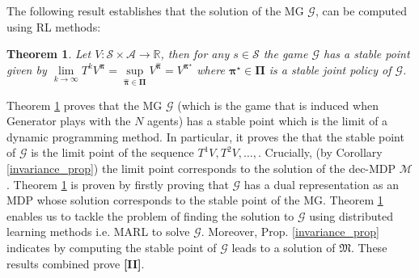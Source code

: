 \documentclass{article}
\newtheorem{theorem}{Theorem}
\begin{document}
The following result establishes that the solution of the MG $\mathcal{G}$, can be computed using RL methods:

\begin{theorem}\label{theorem:existence_2}
Let $V:\mathcal{S}\times\boldsymbol{\mathcal{A}}\to\mathbb{R}$,  then for any $s\in\mathcal{S}$ the game $\mathcal{G}$ has a stable point given by $\underset{k\to\infty}{\lim}T^kV^{\boldsymbol{\pi}}=\underset{{\boldsymbol{\hat{\pi}}}\in\boldsymbol{\Pi}}{\sup}V^{\boldsymbol{\hat{\pi}}}=V^{\boldsymbol{\pi^\star}}$ where $\boldsymbol{\pi^\star}\in\boldsymbol{\Pi}$ is a stable joint policy of $\mathcal{G}$.
\end{theorem}
Theorem \ref{theorem:existence_2} proves that the MG $\mathcal{G}$ (which is the game that is induced when {\selectfont Generator} plays with the $N$ agents) has a stable point which is the limit of a dynamic programming method. In particular, it proves the that the stable point of $\mathcal{G}$ is the limit point of the sequence $T^1V,T^2V,\ldots,$. Crucially, (by Corollary \ref{invariance_prop}) the limit point corresponds to the solution of the dec-MDP $\mathcal{M}$.  Theorem \ref{theorem:existence_2} is proven by firstly proving that $\mathcal{G}$ has a dual representation as an MDP whose solution corresponds to the stable point of the MG.  
% 
% 
Theorem \ref{theorem:existence_2} enables us to tackle the problem of finding the solution to $\mathcal{G}$ using distributed learning methods i.e. MARL to solve $\mathcal{G}$.   
% 
Moreover, Prop. \ref{invariance_prop} indicates by computing the stable point of $\mathcal{G}$ leads to a solution of $\mathfrak{M}$. These results combined prove \textbf{[II]}.
\end{document}
